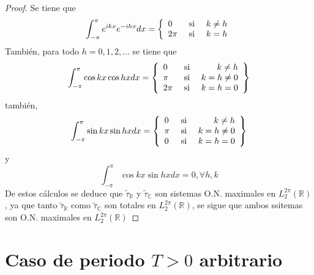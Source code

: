 \documentclass[12pt]{report}
\theoremstyle{largebreak}
\begin{document}
    \begin{proof}
        Se tiene que
        \begin{equation*}
            \int_{-\pi}^\pi e^{ ikx}e^{ -ihx}dx=\left\{
                \begin{array}{lcr}
                    0 & \textup{ si } & k\neq h \\
                    2\pi & \textup{ si } & k=h \\
                \end{array}
            \right.
        \end{equation*}
        También, para todo $h=0,1,2,...$ se tiene que 
        \begin{equation*}
            \int_{-\pi}^\pi\cos kx\cos hxdx=\left\{
                \begin{array}{lcr}
                    0 & \textup{ si } & k\neq h\\
                    \pi & \textup{ si } & k= h\neq0 \\
                    2\pi & \textup{ si } & k= h=0 \\
                \end{array}
            \right\}
        \end{equation*}
        también,
        \begin{equation*}
            \int_{-\pi}^\pi\sin kx\sin hxdx=\left\{
                \begin{array}{lcr}
                    0 & \textup{ si } & k\neq h\\
                    \pi & \textup{ si } & k= h\neq0 \\
                    0 & \textup{ si } & k= h=0 \\
                \end{array}
            \right\}
        \end{equation*}
        y
        \begin{equation*}
            \int_{-\pi}^\pi\cos kx\sin hxdx=0,\forall h,k
        \end{equation*}
        De estos cálculos se deduce que $\tilde{\tau}_{\mathbb{R}}$ y $\tilde{\tau}_{\mathbb{C}}$ son sistemas O.N. maximales en $L_2^{ 2\pi}(\mathbb{R})$, ya que tanto $\tilde{\tau}_{\mathbb{R}}$ como $\tilde{\tau}_{\mathbb{C}}$ son totales en $L_2^{2\pi}(\mathbb{R})$, se sigue que ambos ssitemas son O.N. maximales en $L_2^{2\pi}(\mathbb{R})$
    \end{proof}

    \section{Caso de periodo $T>0$ arbitrario}
\end{document}
